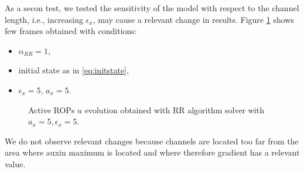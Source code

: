 As a secon test, we tested the sensitivity of the model with respect to the channel length, i.e., increasing $\epsilon_x$, may cause a relevant change in results. Figure \ref{fig:a5epsi5} shows few frames obtained with conditions:
\begin{itemize}
  \item $\alpha_{RR} = 1$,
  \item initial state as in \eqref{eq:initstate},
  \item $\epsilon_x = 5$, $a_x = 5$.
\end{itemize}

\begin{figure}[H]
    \centering
    \quad
    \quad
    \quad
    \caption[Tuning channel prm - $a_x = 5, \epsilon_x = 5$]{Active ROPs $u$ evolution obtained with RR algorithm solver with $a_x = 5, \epsilon_x = 5$.}
    \label{fig:a5epsi5}
\end{figure}
We do not observe relevant changes because channels are located too far from the area where auxin maximum is located and where therefore gradient has a relevant value.

